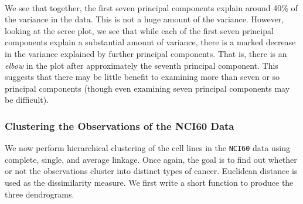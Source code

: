 \documentclass[11pt]{article}
\begin{document}
    \begin{center}
    \end{center}
    { \hspace*{\fill} \\}
    
    We see that together, the first seven principal components explain
around 40\% of the variance in the data. This is not a huge amount of
the variance. However, looking at the scree plot, we see that while each
of the first seven principal components explain a substantial amount of
variance, there is a marked decrease in the variance explained by
further principal components. That is, there is an \emph{elbow} in the
plot after approximately the seventh principal component. This suggests
that there may be little benefit to examining more than seven or so
principal components (though even examining seven principal components
may be difficult).

    \hypertarget{clustering-the-observations-of-the-nci60-data}{%
\subsubsection{Clustering the Observations of the NCI60
Data}\label{clustering-the-observations-of-the-nci60-data}}

We now perform hierarchical clustering of the cell lines in the
\texttt{NCI60} data using complete, single, and average linkage. Once
again, the goal is to find out whether or not the observations cluster
into distinct types of cancer. Euclidean distance is used as the
dissimilarity measure. We first write a short function to produce the
three dendrograms.
\end{document}
